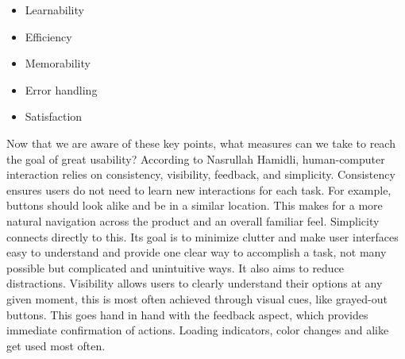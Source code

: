 \begin{itemize}
    \item Learnability
    \newpage

    \item Efficiency

    \item Memorability

    \item Error handling

    \item Satisfaction
\end{itemize}
\autocite{Paul:Usability101}

\blankLine

Now that we are aware of these key points, what measures can we take to reach the goal of great usability? According to Nasrullah Hamidli, human-computer interaction relies on consistency, visibility, feedback, and simplicity. Consistency ensures users do not need to learn new interactions for each task. For example, buttons should look alike and be in a similar location. This makes for a more natural navigation across the product and an overall familiar feel. Simplicity connects directly to this. Its goal is to minimize clutter and make user interfaces easy to understand and provide one clear way to accomplish a task, not many possible but complicated and unintuitive ways. It also aims to reduce distractions. Visibility allows users to clearly understand their options at any given moment, this is most often achieved through visual cues, like grayed-out buttons. This goes hand in hand with the feedback aspect, which provides immediate confirmation of actions. Loading indicators, color changes and alike get used most often.

